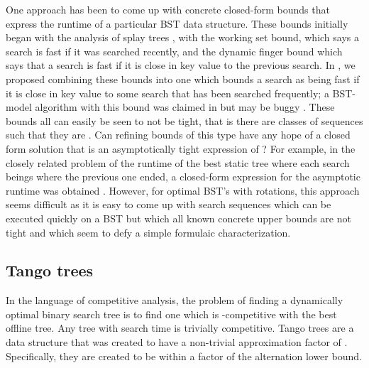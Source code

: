 \documentclass[11pt]{article}
\begin{document}
One approach has been to come up with concrete closed-form bounds that express the runtime of a particular BST data structure. These bounds initially began with the analysis of splay trees \cite{DBLP:journals/jacm/SleatorT85}, with the working set bound, which says a search is fast if it was searched recently, and the dynamic finger bound \cite{DBLP:journals/siamcomp/Cole00,DBLP:journals/siamcomp/ColeMSS00}  which says that a search is fast if it is close in key value to the previous search. In \cite{DBLP:journals/tcs/BadoiuCDI07}, we proposed combining these bounds into one which bounds a search as being fast if it is close in key value to some search that has been searched frequently; a BST-model algorithm with this bound was claimed in \cite{jdthesis} but may be buggy \cite{sleatortalk}. These bounds all can easily be seen to not be tight, that is there are classes of sequences  such that they are . Can refining bounds of this type have any hope of a closed form solution that is an asymptotically tight expression of ? For example, in the closely related problem of the runtime of the best static tree where each search beings where the previous one ended, a closed-form expression for the asymptotic runtime was obtained \cite{DBLP:journals/corr/abs-1304-6897}. However, for optimal BST's with rotations, this approach seems difficult as it is easy to come up with search sequences which can be executed quickly on a BST but which all known concrete upper bounds are not tight and which seem to defy a simple formulaic characterization.







\subsection{Tango trees \cite{DBLP:journals/siamcomp/DemaineHIP07}}
In the language of competitive analysis, the problem of finding a dynamically optimal binary search tree is to find one which is -competitive with the best offline tree. 
Any tree with  search time is trivially  competitive. Tango trees are a data structure that was created to have a non-trivial approximation factor of .
Specifically, they are created to be within a  factor of the alternation lower bound.
\end{document}

